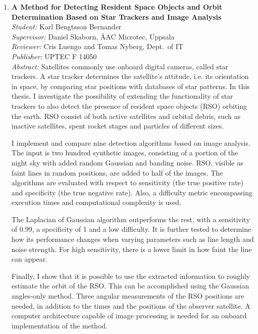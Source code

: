 \begin{small}
\begin{enumerate}
\item\textbf{A Method for Detecting Resident Space Objects and Orbit Determination Based on Star Trackers and Image Analysis}\\
  \emph{Student:} Karl Bengtsson Bernander\\
  \emph{Supervisor:} Daniel Skaborn, ÅAC Microtec, Uppsala\\
  \emph{Reviewer:} Cris Luengo and Tomas Nyberg, Dept.~of IT\\
  \emph{Publisher:} UPTEC F 14050 \\
  \emph{Abstract:} Satellites commonly use onboard digital cameras, called star trackers. A star tracker determines the satellite's attitude, i.e. its orientation in space, by comparing star positions with databases of star patterns. In this thesis, I investigate the possibility of extending the functionality of star trackers to also detect the presence of resident space objects (RSO) orbiting the earth. RSO consist of both active satellites and orbital debris, such as inactive satellites, spent rocket stages and particles of different sizes.

I implement and compare nine detection algorithms based on image analysis. The input is two hundred synthetic images, consisting of a portion of the night sky with added random Gaussian and banding noise. RSO, visible as faint lines in random positions, are added to half of the images. The algorithms are evaluated with respect to sensitivity (the true positive rate) and specificity (the true negative rate). Also, a difficulty metric encompassing execution times and computational complexity is used.

The Laplacian of Gaussian algorithm outperforms the rest, with a sensitivity of 0.99, a specificity of 1 and a low difficulty. It is further tested to determine how its performance changes when varying parameters such as line length and noise strength. For high sensitivity, there is a lower limit in how faint the line can appear.

Finally, I show that it is possible to use the extracted information to roughly estimate the orbit of the RSO. This can be accomplished using the Gaussian angles-only method. Three angular measurements of the RSO positions are needed, in addition to the times and the positions of the observer satellite. A computer architecture capable of image processing is needed for an onboard implementation of the method.


\end{enumerate}
\end{small}
